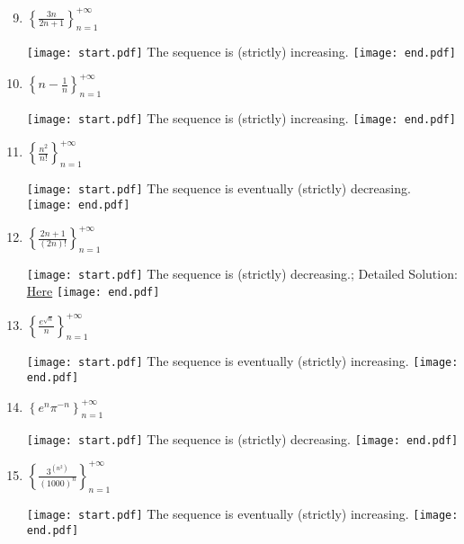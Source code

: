 \documentclass[12pt]{article}
\begin{document}
 
\begin{enumerate}
\setcounter{enumi}{8}
  
\item $\left\{ \frac{3n}{2n+1} \right\}_{n = 1}^{+\infty}$

\texttt{[image: start.pdf]}
{{The sequence is (strictly) increasing.}}
\texttt{[image: end.pdf]}


\item $\left\{ n - \frac{1}{n} \right\}_{n = 1}^{+\infty}$

\texttt{[image: start.pdf]}
{{The sequence is (strictly) increasing.}}
\texttt{[image: end.pdf]}


\item $\left\{ \frac{n^2}{n!} \right\}_{n = 1}^{+\infty}$

\texttt{[image: start.pdf]}
{{The sequence is eventually (strictly) decreasing.}}
\texttt{[image: end.pdf]}


\item $\left\{ \frac{2n+1}{(2n)!} \right\}_{n = 1}^{+\infty}$

\texttt{[image: start.pdf]}
{{The sequence is (strictly) decreasing.; Detailed Solution: \textcolor{blue}{\href{http://www.math.drexel.edu/classes/Calculus/resources/Math123HW/Solutions/123_06_Monotone_Sequences_12.pdf}{Here}}}}
\texttt{[image: end.pdf]}



\item $\left\{ \frac{e^{\sqrt{n}}}{n} \right\}_{n=1}^{+\infty}$

\texttt{[image: start.pdf]}
{{The sequence is eventually (strictly) increasing.}}
\texttt{[image: end.pdf]}



\item $\left\{ e^n \pi^{-n} \right\}_{n = 1}^{+\infty}$

\texttt{[image: start.pdf]}
{{The sequence is (strictly) decreasing.}}
\texttt{[image: end.pdf]}


\item $\left\{ \frac{3^{(n^2)}}{(1000)^n} \right\}_{n = 1}^{+\infty}$

\texttt{[image: start.pdf]}
{{The sequence is eventually (strictly) increasing.}}
\texttt{[image: end.pdf]}



\end{enumerate}
\end{document}
